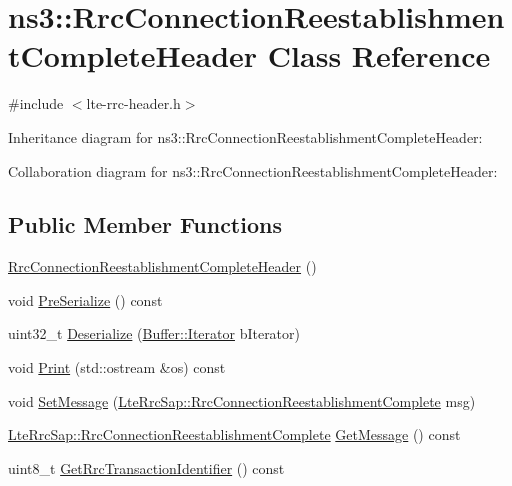 \hypertarget{classns3_1_1RrcConnectionReestablishmentCompleteHeader}{}\section{ns3\+:\+:Rrc\+Connection\+Reestablishment\+Complete\+Header Class Reference}
\label{classns3_1_1RrcConnectionReestablishmentCompleteHeader}


{\ttfamily \#include $<$lte-\/rrc-\/header.\+h$>$}



Inheritance diagram for ns3\+:\+:Rrc\+Connection\+Reestablishment\+Complete\+Header\+:


Collaboration diagram for ns3\+:\+:Rrc\+Connection\+Reestablishment\+Complete\+Header\+:
\subsection*{Public Member Functions}
\begin{DoxyCompactItemize}
\item 
\hyperlink{classns3_1_1RrcConnectionReestablishmentCompleteHeader_a0e250e9fae896566d089bce52d2e5cf8}{Rrc\+Connection\+Reestablishment\+Complete\+Header} ()
\item 
void \hyperlink{classns3_1_1RrcConnectionReestablishmentCompleteHeader_af3dd3d72415d18bf13cebe847bb5191f}{Pre\+Serialize} () const 
\item 
uint32\+\_\+t \hyperlink{classns3_1_1RrcConnectionReestablishmentCompleteHeader_a21ddb8fee9216464e213aee5b3f91dac}{Deserialize} (\hyperlink{classns3_1_1Buffer_1_1Iterator}{Buffer\+::\+Iterator} b\+Iterator)
\item 
void \hyperlink{classns3_1_1RrcConnectionReestablishmentCompleteHeader_a6403e244bfd9831623f830986328bbfc}{Print} (std\+::ostream \&os) const 
\item 
void \hyperlink{classns3_1_1RrcConnectionReestablishmentCompleteHeader_a35bbdff43c688be5c3d738dce0835f43}{Set\+Message} (\hyperlink{structns3_1_1LteRrcSap_1_1RrcConnectionReestablishmentComplete}{Lte\+Rrc\+Sap\+::\+Rrc\+Connection\+Reestablishment\+Complete} msg)
\item 
\hyperlink{structns3_1_1LteRrcSap_1_1RrcConnectionReestablishmentComplete}{Lte\+Rrc\+Sap\+::\+Rrc\+Connection\+Reestablishment\+Complete} \hyperlink{classns3_1_1RrcConnectionReestablishmentCompleteHeader_a3605878a3d8769c4be08148aa95d495c}{Get\+Message} () const 
\item 
uint8\+\_\+t \hyperlink{classns3_1_1RrcConnectionReestablishmentCompleteHeader_a8b7fac96407ed54a47affd2f5f5c02b6}{Get\+Rrc\+Transaction\+Identifier} () const 
\end{DoxyCompactItemize}
